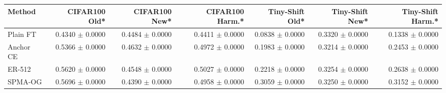 \begin{tabular}{lrrrrrr}
\toprule
Method & CIFAR100 Old* & CIFAR100 New* & CIFAR100 Harm.* & Tiny-Shift Old* & Tiny-Shift New* & Tiny-Shift Harm.*\\
\midrule
Plain FT & 0.4340 $\pm$ 0.0000 & 0.4484 $\pm$ 0.0000 & 0.4411 $\pm$ 0.0000 & 0.0838 $\pm$ 0.0000 & 0.3320 $\pm$ 0.0000 & 0.1338 $\pm$ 0.0000\\
Anchor CE & 0.5366 $\pm$ 0.0000 & 0.4632 $\pm$ 0.0000 & 0.4972 $\pm$ 0.0000 & 0.1983 $\pm$ 0.0000 & 0.3214 $\pm$ 0.0000 & 0.2453 $\pm$ 0.0000\\
ER-512 & 0.5620 $\pm$ 0.0000 & 0.4548 $\pm$ 0.0000 & 0.5027 $\pm$ 0.0000 & 0.2218 $\pm$ 0.0000 & 0.3254 $\pm$ 0.0000 & 0.2638 $\pm$ 0.0000\\
SPMA-OG & 0.5696 $\pm$ 0.0000 & 0.4390 $\pm$ 0.0000 & 0.4958 $\pm$ 0.0000 & 0.3059 $\pm$ 0.0000 & 0.3250 $\pm$ 0.0000 & 0.3152 $\pm$ 0.0000\\
\bottomrule
\end{tabular}
